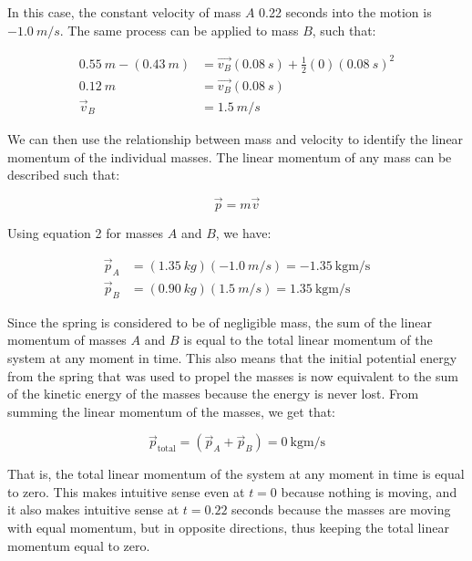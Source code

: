 \documentclass[12pt]{article}
\begin{document}
In this case, the constant velocity of mass $A$ 0.22 seconds into the motion is $\SI{-1.0}{m/s}$. The same process can be applied to mass $B$, such that:

\begin{equation*}
    \begin{split}
        \SI{0.55}{m} - (\SI{0.43}{m}) & = \vec{v_B}(\SI{0.08}{s}) + \frac{1}{2}(0)(\SI{0.08}{s})^2 \\
        \SI{0.12}{m} & = \vec{v_B}(\SI{0.08}{s}) \\
        \vec{v}_B & = \SI{1.5}{m/s}
    \end{split}
\end{equation*}

We can then use the relationship between mass and velocity to identify the linear momentum of the individual masses. The linear momentum of any mass can be described such that:

\begin{equation} \label{eq2}
    \vec{p} = m\vec{v}
\end{equation}

Using equation 2 for masses $A$ and $B$, we have:

\begin{equation*}
    \begin{split}
        \vec{p}_A & = (\SI{1.35}{kg})(\SI{-1.0}{m/s}) = \SI{-1.35}{\kilogram\metre\per\second} \\
        \vec{p}_B & = (\SI{0.90}{kg})(\SI{1.5}{m/s}) = \SI{1.35}{\kilogram\metre\per\second}
    \end{split}
\end{equation*}

Since the spring is considered to be of negligible mass, the sum of the linear momentum of masses $A$ and $B$ is equal to the total linear momentum of the system at any moment in time. This also means that the initial potential energy from the spring that was used to propel the masses is now equivalent to the sum of the kinetic energy of the masses because the energy is never lost. From summing the linear momentum of the masses, we get that:

\begin{equation*}
    \vec{p}_\text{total} = (\vec{p}_A + \vec{p}_B) = \SI{0}{\kilogram\metre\per\second}
\end{equation*}

That is, the total linear momentum of the system at any moment in time is equal to zero. This makes intuitive sense even at $t = 0$ because nothing is moving, and it also makes intuitive sense at $t = 0.22$ seconds because the masses are moving with equal momentum, but in opposite directions, thus keeping the total linear momentum equal to zero.
\end{document}
